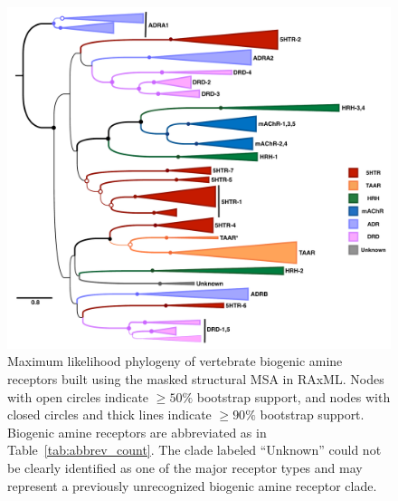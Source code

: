 \documentclass[fleqn,10pt]{wlpeerj}
\begin{document}
\newpage



\begin{figure}[htbp]
	\centerline{\includegraphics[width=18cm]{figures/masked_part_phylogeny.pdf}}
	\caption{\label{phylogeny} Maximum likelihood phylogeny of vertebrate biogenic amine receptors built using the masked structural MSA in RAxML. Nodes with open circles indicate $\geq 50\%$ bootstrap support, and nodes with closed circles and thick lines indicate $\geq 90\%$ bootstrap support. Biogenic amine receptors are abbreviated as in Table~\ref{tab:abbrev_count}. The clade labeled ``Unknown'' could not be clearly identified as one of the major receptor types and may represent a previously unrecognized biogenic amine receptor clade.}
\end{figure}


\newpage
\end{document}
